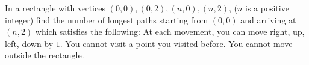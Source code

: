In a rectangle with vertices $(0, 0), (0, 2), (n,0),(n, 2)$, ($n$ is a positive integer) find the number of longest paths
starting from $(0, 0)$ and arriving at $(n, 2)$ which satisfies the following:
At each movement, you can move right, up, left, down by $1$.  You cannot visit a point you visited before. You cannot move outside the rectangle.
